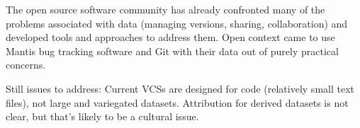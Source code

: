 \documentclass[10pt,a4paper,twocolumn]{article}
\begin{document}
The open source software community has already confronted many of the problems associated with data (managing versions, sharing, collaboration) and developed tools and approaches to address them. 
Open context came to use Mantis bug tracking software and Git with their data out of purely practical concerns.

Still issues to address: Current VCSs are designed for code (relatively small text files), not large and variegated datasets. 
Attribution for derived datasets is not clear, but that's likely to be a cultural issue.


\nocite{*}
{\small
}

\listoftodos






\end{document}
